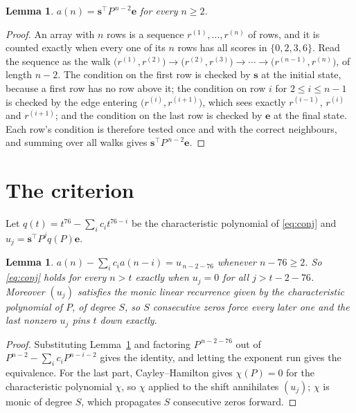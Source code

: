 \documentclass[11pt,a4paper]{article}
\theoremstyle{plain}
\newtheorem{lemma}[theorem]{Lemma}
\theoremstyle{definition}
\begin{document}
\begin{lemma}\label{lem:walk}
$a(n)=\mathbf{s}^{\!\top}P^{\,n-2}\mathbf{e}$ for every $n\ge2$.
\end{lemma}

\begin{proof}
An array with $n$ rows is a sequence $r^{(1)},\dots,r^{(n)}$ of rows, and it is counted
exactly when every one of its $n$ rows has all scores in $\{0,2,3,6\}$. Read the sequence as the
walk $\bigl(r^{(1)},r^{(2)}\bigr)\to\bigl(r^{(2)},r^{(3)}\bigr)\to\cdots\to
\bigl(r^{(n-1)},r^{(n)}\bigr)$, of length $n-2$. The condition on the first row is
checked by $\mathbf{s}$ at the initial state, because a first row has no row above it; the
condition on row $i$ for $2\le i\le n-1$ is checked by the edge entering
$\bigl(r^{(i)},r^{(i+1)}\bigr)$, which sees exactly $r^{(i-1)}$, $r^{(i)}$ and
$r^{(i+1)}$; and the condition on the last row is checked by $\mathbf{e}$ at the final
state. Each row's condition is therefore tested once and with the correct neighbours, and
summing over all walks gives $\mathbf{s}^{\!\top}P^{\,n-2}\mathbf{e}$.
\end{proof}

\section{The criterion}

Let $q(t)=t^{76}-\sum_i c_i t^{76-i}$ be the characteristic polynomial of
\eqref{eq:conj} and $u_j=\mathbf{s}^{\!\top}P^{j}q(P)\mathbf{e}$.

\begin{lemma}\label{lem:crit}
$a(n)-\sum_i c_i a(n-i)=u_{\,n-2-76}$ whenever $n-76\ge2$. So \eqref{eq:conj}
holds for every $n>t$ exactly when $u_j=0$ for all $j>t-2-76$. Moreover $(u_j)$
satisfies the monic linear recurrence given by the characteristic polynomial of $P$, of
degree $S$, so $S$ consecutive zeros force every later one and the last nonzero $u_j$ pins
$t$ down exactly.
\end{lemma}

\begin{proof}
Substituting Lemma~\ref{lem:walk} and factoring $P^{\,n-2-76}$ out of
$P^{n-2}-\sum_i c_i P^{n-i-2}$ gives the identity, and letting the exponent run gives the
equivalence. For the last part, Cayley--Hamilton gives $\chi(P)=0$ for the characteristic
polynomial $\chi$, so $\chi$ applied to the shift annihilates $(u_j)$; $\chi$ is monic of
degree $S$, which propagates $S$ consecutive zeros forward.
\end{proof}
\end{document}
